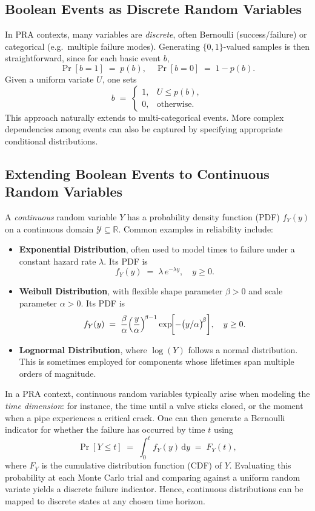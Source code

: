 \subsection{Boolean Events as Discrete Random Variables}
In PRA contexts, many variables are \emph{discrete}, often Bernoulli (success/failure) or categorical (e.g.\ multiple failure modes). Generating \(\{0,1\}\)-valued samples is then straightforward, since for each basic event \(b\),
\[
\Pr[b=1] \;=\; p(b),
\quad
\Pr[b=0] \;=\; 1-p(b).
\]
Given a uniform variate \(U\), one sets
\[
b
\;=\;
\begin{cases}
1, & U \le p(b),\\
0, & \text{otherwise}.
\end{cases}
\]
This approach naturally extends to multi-categorical events. More complex dependencies among events can also be captured by specifying appropriate conditional distributions.

\subsection{Extending Boolean Events to Continuous Random Variables}
A \emph{continuous} random variable \(Y\) has a probability density function (PDF) \(f_Y(y)\) on a continuous domain \(\mathcal{Y}\subseteq \mathbb{R}\). Common examples in reliability include:
\begin{itemize}
\item \textbf{Exponential Distribution}, often used to model times to failure under a constant hazard rate \(\lambda\). Its PDF is
\[
f_Y(y) \;=\; \lambda\, e^{-\lambda y},
\quad
y \ge 0.
\]
\item \textbf{Weibull Distribution}, with flexible shape parameter \(\beta>0\) and scale parameter \(\alpha>0\). Its PDF is
\[
f_Y(y)
\;=\;
\frac{\beta}{\alpha}
\Bigl(\frac{y}{\alpha}\Bigr)^{\!\beta -1}
\exp\!\biggl[-\bigl(y/\alpha\bigr)^{\!\beta}\biggr],
\quad
y\ge 0.
\]
\item \textbf{Lognormal Distribution}, where \(\log(Y)\) follows a normal distribution. This is sometimes employed for components whose lifetimes span multiple orders of magnitude.
\end{itemize}
In a PRA context, continuous random variables typically arise when modeling the \emph{time dimension}: for instance, the time until a valve sticks closed, or the moment when a pipe experiences a critical crack. One can then generate a Bernoulli indicator for whether the failure has occurred by time \(t\) using
\[
\Pr[Y \le t]
\;=\;
\int_{0}^{t} f_Y(y)\,\mathrm{d}y
\;=\;
F_Y(t),
\]
where \(F_Y\) is the cumulative distribution function (CDF) of \(Y\). Evaluating this probability at each Monte Carlo trial and comparing against a uniform random variate yields a discrete failure indicator. Hence, continuous distributions can be mapped to discrete states at any chosen time horizon.




